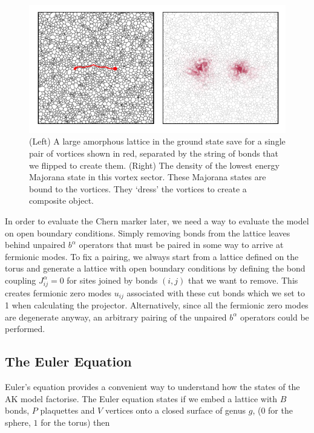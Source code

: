 \hypertarget{fig:majorana_bound_states}{%
\begin{figure}
\centering
\includegraphics[width=1\textwidth,height=\textheight]{figure_code/amk_chapter/majorana_bound_states/majorana_bound_states}
\caption[{Majorana Bound States}]{(Left) A large amorphous lattice in the ground state save for a single pair of vortices shown in red, separated by the string of bonds that we flipped to create them. (Right) The density of the lowest energy Majorana state in this vortex sector. These Majorana states are bound to the vortices. They `dress' the vortices to create a composite object.}
\label{fig:majorana_bound_states}
\end{figure}
}

In order to evaluate the Chern marker later, we need a way to evaluate the model on open boundary conditions. Simply removing bonds from the lattice leaves behind unpaired \(b^\alpha\) operators that must be paired in some way to arrive at fermionic modes. To fix a pairing, we always start from a lattice defined on the torus and generate a lattice with open boundary conditions by defining the bond coupling \(J^{\alpha}_{ij} = 0\) for sites joined by bonds \((i,j)\) that we want to remove. This creates fermionic zero modes \(u_{ij}\) associated with these cut bonds which we set to 1 when calculating the projector. Alternatively, since all the fermionic zero modes are degenerate anyway, an arbitrary pairing of the unpaired \(b^\alpha\) operators could be performed.

\hypertarget{the-euler-equation}{%
\subsection{The Euler Equation}\label{the-euler-equation}}

Euler's equation provides a convenient way to understand how the states of the AK model factorise. The Euler equation states if we embed a lattice with \(B\) bonds, \(P\) plaquettes and \(V\) vertices onto a closed surface of genus \(g\), (\(0\) for the sphere, \(1\) for the torus) then

